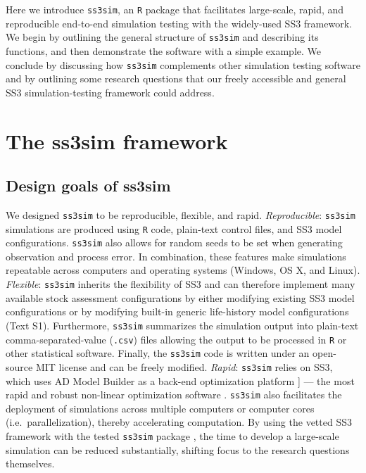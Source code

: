 \documentclass[12pt]{article}
\begin{document}
Here we introduce \texttt{ss3sim}, an \texttt{R} package that facilitates large-scale, rapid, and reproducible end-to-end simulation testing with the widely-used SS3 framework. We begin by outlining the general structure of \texttt{ss3sim} and describing its functions, and then demonstrate the software with a simple example. We conclude by discussing how \texttt{ss3sim} complements other simulation testing software and by outlining some research questions that our freely accessible and general SS3 simulation-testing framework could address.

\section*{The ss3sim framework}

\subsection*{Design goals of ss3sim}

We designed \texttt{ss3sim} to be reproducible, flexible, and rapid. \emph{Reproducible}: \texttt{ss3sim} simulations are produced using \texttt{R} code, plain-text control files, and SS3 model configurations. \texttt{ss3sim} also allows for random seeds to be set when generating observation and process error. In combination, these features make simulations repeatable across computers and operating systems (Windows, OS X, and Linux). \emph{Flexible}: \texttt{ss3sim} inherits the flexibility of SS3 and can therefore implement many available stock assessment configurations by either modifying existing SS3 model configurations or by modifying built-in generic life-history model configurations (Text S1). Furthermore, \texttt{ss3sim} summarizes the simulation output into plain-text comma-separated-value (\texttt{.csv}) files allowing the output to be processed in \texttt{R} or other statistical software. Finally, the \texttt{ss3sim} code is written under an open-source MIT license and can be freely modified. \emph{Rapid}: \texttt{ss3sim} relies on SS3, which uses AD Model Builder as a back-end optimization platform \cite{fournier2012}{]} --- the most rapid and robust non-linear optimization software \cite{bolker2013}. \texttt{ss3sim} also facilitates the deployment of simulations across multiple computers or computer cores (i.e.~parallelization), thereby accelerating computation. By using the vetted SS3 framework \cite{methot2013} with the tested \texttt{ss3sim} package \cite{johnson2013, ono2013}, the time to develop a large-scale simulation can be reduced substantially, shifting focus to the research questions themselves.
\end{document}

